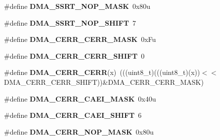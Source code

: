 \begin{DoxyCompactItemize}
\item 
\#define {\bfseries D\+M\+A\+\_\+\+S\+S\+R\+T\+\_\+\+N\+O\+P\+\_\+\+M\+A\+SK}~0x80u\hypertarget{group__DMA__Register__Masks_gad515a6cb794fc947138fac918dedd068}{}\label{group__DMA__Register__Masks_gad515a6cb794fc947138fac918dedd068}

\item 
\#define {\bfseries D\+M\+A\+\_\+\+S\+S\+R\+T\+\_\+\+N\+O\+P\+\_\+\+S\+H\+I\+FT}~7\hypertarget{group__DMA__Register__Masks_ga0c698d2dc363fc0487cccc5dfbd4fed5}{}\label{group__DMA__Register__Masks_ga0c698d2dc363fc0487cccc5dfbd4fed5}

\item 
\#define {\bfseries D\+M\+A\+\_\+\+C\+E\+R\+R\+\_\+\+C\+E\+R\+R\+\_\+\+M\+A\+SK}~0x\+Fu\hypertarget{group__DMA__Register__Masks_ga291fce290f4fce77f31d4f210781a5cc}{}\label{group__DMA__Register__Masks_ga291fce290f4fce77f31d4f210781a5cc}

\item 
\#define {\bfseries D\+M\+A\+\_\+\+C\+E\+R\+R\+\_\+\+C\+E\+R\+R\+\_\+\+S\+H\+I\+FT}~0\hypertarget{group__DMA__Register__Masks_ga3aed793831e2681ef8989bbe67ffaa17}{}\label{group__DMA__Register__Masks_ga3aed793831e2681ef8989bbe67ffaa17}

\item 
\#define {\bfseries D\+M\+A\+\_\+\+C\+E\+R\+R\+\_\+\+C\+E\+RR}(x)~(((uint8\+\_\+t)(((uint8\+\_\+t)(x))$<$$<$D\+M\+A\+\_\+\+C\+E\+R\+R\+\_\+\+C\+E\+R\+R\+\_\+\+S\+H\+I\+FT))\&D\+M\+A\+\_\+\+C\+E\+R\+R\+\_\+\+C\+E\+R\+R\+\_\+\+M\+A\+SK)\hypertarget{group__DMA__Register__Masks_ga8b912d2bceaf84a23183c7e93a862b1f}{}\label{group__DMA__Register__Masks_ga8b912d2bceaf84a23183c7e93a862b1f}

\item 
\#define {\bfseries D\+M\+A\+\_\+\+C\+E\+R\+R\+\_\+\+C\+A\+E\+I\+\_\+\+M\+A\+SK}~0x40u\hypertarget{group__DMA__Register__Masks_ga7998031f3e0e7906d352da54eb92a1a8}{}\label{group__DMA__Register__Masks_ga7998031f3e0e7906d352da54eb92a1a8}

\item 
\#define {\bfseries D\+M\+A\+\_\+\+C\+E\+R\+R\+\_\+\+C\+A\+E\+I\+\_\+\+S\+H\+I\+FT}~6\hypertarget{group__DMA__Register__Masks_ga04db9fa5c262642ad17f27d1cad24fba}{}\label{group__DMA__Register__Masks_ga04db9fa5c262642ad17f27d1cad24fba}

\item 
\#define {\bfseries D\+M\+A\+\_\+\+C\+E\+R\+R\+\_\+\+N\+O\+P\+\_\+\+M\+A\+SK}~0x80u\hypertarget{group__DMA__Register__Masks_gac284972d1fac094dd241e268d7a0ee17}{}\label{group__DMA__Register__Masks_gac284972d1fac094dd241e268d7a0ee17}


\end{DoxyCompactItemize}
